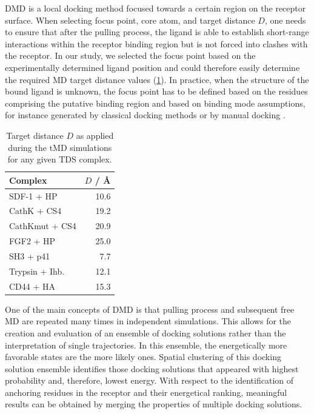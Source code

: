 DMD is a local docking method focused towards a certain region on the receptor
surface. When selecting focus point, core atom, and target distance $D$, one
needs to ensure that after the pulling process, the ligand is able to establish
short-range interactions within the receptor binding region but is not forced
into clashes with the receptor. In our study, we selected the focus point based
on the experimentally determined ligand position and could therefore easily
determine the required MD target distance values
(\cref{tab:dmd:tds_target_distances}). In practice, when the structure of the
bound ligand is unknown, the focus point has to be defined based on the residues
comprising the putative binding region and based on binding mode assumptions,
for instance generated by classical docking methods or by manual docking .

\begin{table}
\scriptsize
\centering
\renewcommand{\arraystretch}{1.3}
\begin{tabular}{@{}lr@{}}
\toprule
Complex & $D$ / \si{\angstrom} \\
\midrule
SDF-1 + HP & 10.6 \\
CathK + CS4 & 19.2 \\
CathKmut + CS4 & 20.9 \\
FGF2 + HP & 25.0 \\
SH3 + p41 & 7.7 \\
Trypsin + Ihb. & 12.1 \\
CD44 + HA & 15.3 \\
\bottomrule
\end{tabular}
\caption{
Target distance $D$ as applied during the tMD simulations for any given TDS complex.
}
\label{tab:dmd:tds_target_distances}
\end{table}


One of the main concepts of DMD is that pulling process and subsequent free MD
are repeated many times in independent simulations. This allows for the creation
and evaluation of an ensemble of docking solutions rather than the
interpretation of single trajectories. In this ensemble, the energetically more
favorable states are the more likely ones. Spatial clustering of this docking
solution ensemble identifies those docking solutions that appeared with highest
probability and, therefore, lowest energy. With respect to the identification of
anchoring residues in the receptor and their energetical ranking, meaningful
results can be obtained by merging the properties of multiple docking solutions.


